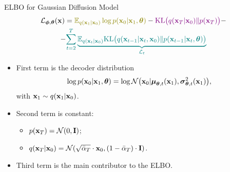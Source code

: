 \documentclass{beamer}
\begin{document}
\begin{frame}{ELBO for Gaussian Diffusion Model}
        \vspace{-0.5cm}
        \begin{multline*}
            \cL_{\bphi, \btheta}(\bx) =  {\color{olive}\bbE_{q(\bx_1 | \bx_0)} \log p(\bx_0 | \bx_1, \btheta)} - {\color{violet}\KL\bigl(q(\bx_T | \bx_0) \| p(\bx_T)\bigr)} - \\
            - {\color{teal}\sum_{t=2}^T \underbrace{ \bbE_{q(\bx_t | \bx_0)} \KL \bigl(q(\bx_{t-1} | \bx_t, \bx_0) \| p(\bx_{t - 1} | \bx_t, \btheta )\bigr)}_{\cL_t}}
        \end{multline*}
        \vspace{-0.5cm}
    \begin{itemize}
        \item {\color{olive}First term} is the decoder distribution
        \[
            \log p(\mathbf{x}_0 | \mathbf{x}_1, \boldsymbol{\theta}) = \log \mathcal{N} \bigl(\mathbf{x}_0 | \boldsymbol{\mu}_{\boldsymbol{\theta}, t}(\mathbf{x}_1), \boldsymbol{\sigma}_{\boldsymbol{\theta}, t}^2(\mathbf{x}_1)\bigr),
        \] 
        with $\mathbf{x}_1 \sim q(\mathbf{x}_1 | \mathbf{x}_0)$.
        \item {\color{violet}Second term} is constant: 
        \begin{itemize}
            \item $p(\mathbf{x}_T) = \mathcal{N}(0, \mathbf{I})$;
            \item $q(\mathbf{x}_T | \mathbf{x}_0) = \mathcal{N}(\sqrt{\bar{\alpha}_T} \cdot \mathbf{x}_0, (1 - \bar{\alpha}_T) \cdot \mathbf{I})$.
        \end{itemize}
        \item {\color{teal}Third term} is the main contributor to the ELBO.
    \end{itemize}
\end{frame}
\end{document}
